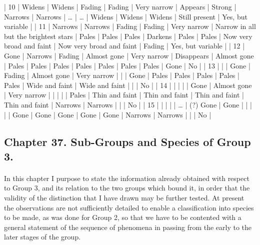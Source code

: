 \documentclass[a4paper, 12pt, oneside, polutonikogreek, english]{article}
\begin{document}
| 10              | Widens            | Widens            | Fading            | Fading            | Very narrow             | Appears                | Strong               | Narrows               | Narrows               | …                  | …                  | Widens               | Widens               | Widens               | Still present            | Yes, but variable        |
| 11              | Narrows            | Narrows            | Fading            | Fading            | Very narrow             | Narrow in all but the brightest stars | Pales                | Pales                | Pales                | Darkens               | Pales                | Pales                | Now very broad and faint      | Now very broad and faint      | Fading               | Yes, but variable        |
| 12              | Gone             | Narrows            | Fading            | Almost gone          | Very narrow             | Disappears              | Almost gone             | Pales                | Pales                | Pales                | Pales                | Pales                | Pales                | Pales                | Gone                | No               |
| 13              | |               | Gone             | Fading            | Almost gone          | Very narrow             | |                   | Gone                | Pales                | Pales                | Pales                | Pales                | Pales                | Wide and faint           | Wide and faint           | |                  | No               |
| 14              | |               | |               | Gone             | Almost gone          | Very narrow             | |                   | |                  | Pales                | Thin and faint           | Thin and faint           | Thin and faint           | Thin and faint           | Narrows               | Narrows               | |                  | No               |
| 15              | |               | |               | …               | (?) Gone           | Gone                | |                   | |                  | Gone                | Gone                | Gone                | Gone                | Gone                | Narrows               | Narrows               | |                  | No               |
\clearpage
\subsection{Chapter 37. Sub-Groups and Species of Group 3.}
\paragraph{}
In this chapter I purpose to state the information already obtained with respect to Group 3, and its relation to the two groups which bound it, in order that the validity of the distinction that I have drawn may be further tested. At present the observations are not sufficiently detailed to enable a classification into species to be made, as was done for Group 2, so that we have to be contented with a general statement of the sequence of phenomena in passing from the early to the later stages of the group.
\end{document}

